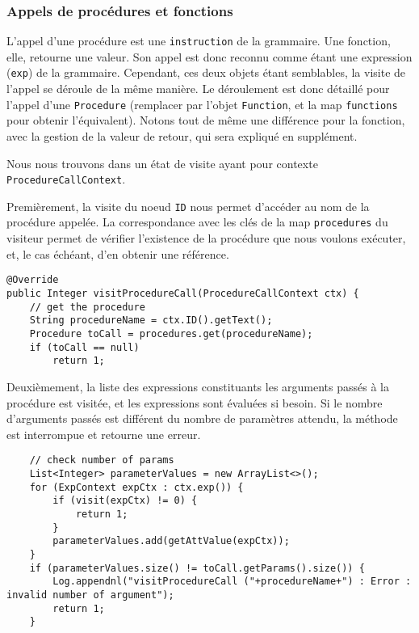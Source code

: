 \documentclass[a4paper,11pt]{article}
\begin{document}
\subsubsection{Appels de procédures et fonctions}
L'appel d'une procédure est une \lstinline$instruction$ de la grammaire. Une fonction, elle, retourne une valeur. Son appel est donc reconnu comme étant une expression (\lstinline$exp$) de la grammaire. Cependant, ces deux objets étant semblables, la visite de l'appel se déroule de la même manière. Le déroulement est donc détaillé pour l'appel d'une \lstinline$Procedure$ (remplacer par l'objet \lstinline$Function$, et la map \lstinline$functions$ pour obtenir l'équivalent). Notons tout de même une différence pour la fonction, avec la gestion de la valeur de retour, qui sera expliqué en supplément.

Nous nous trouvons dans un état de visite ayant pour contexte \lstinline$ProcedureCallContext$.

Premièrement, la visite du noeud \lstinline$ID$ nous permet d'accéder au nom de la procédure appelée. La correspondance avec les clés de la map \lstinline$procedures$ du visiteur permet de vérifier l'existence de la procédure que nous voulons exécuter, et, le cas échéant, d'en obtenir une référence. 

\begin{lstlisting}
@Override
public Integer visitProcedureCall(ProcedureCallContext ctx) {
    // get the procedure
    String procedureName = ctx.ID().getText();
    Procedure toCall = procedures.get(procedureName);
    if (toCall == null)
        return 1;
\end{lstlisting}

Deuxièmement, la liste des expressions constituants les arguments passés à la procédure est visitée, et les expressions sont évaluées si besoin. Si le nombre d'arguments passés est différent du nombre de paramètres attendu, la méthode est interrompue et retourne une erreur. 

\begin{lstlisting}
    // check number of params
    List<Integer> parameterValues = new ArrayList<>();
    for (ExpContext expCtx : ctx.exp()) {
        if (visit(expCtx) != 0) {
            return 1;
        }
        parameterValues.add(getAttValue(expCtx));
    }
    if (parameterValues.size() != toCall.getParams().size()) {
        Log.appendnl("visitProcedureCall ("+procedureName+") : Error : invalid number of argument");
        return 1;
    }
\end{lstlisting}
\end{document}
